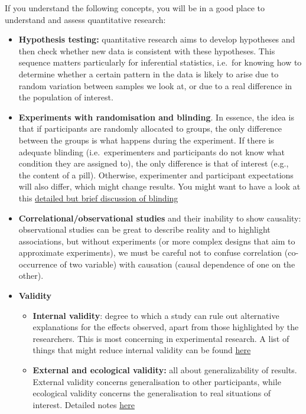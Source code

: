 \documentclass[
]{book}
\providecommand{\tightlist}{%
  \setlength{\itemsep}{0pt}\setlength{\parskip}{0pt}}
\begin{document}
If you understand the following concepts, you will be in a good place to understand and assess quantitative research:

\begin{itemize}
\item
  \textbf{Hypothesis testing:} quantitative research aims to develop hypotheses and then check whether new data is consistent with these hypotheses. This sequence matters particularly for inferential statistics, i.e.~for knowing how to determine whether a certain pattern in the data is likely to arise due to random variation between samples we look at, or due to a real difference in the population of interest.
\item
  \textbf{Experiments with randomisation and blinding}. In essence, the idea is that if participants are randomly allocated to groups, the only difference between the groups is what happens during the experiment. If there is adequate blinding (i.e.~experimenters and participants do not know what condition they are assigned to), the only difference is that of interest (e.g., the content of a pill). Otherwise, experimenter and participant expectations will also differ, which might change results. You might want to have a look at this \href{https://s4be.cochrane.org/blog/2017/06/26/blinding-comprehensive-guide-students/}{detailed but brief discussion of blinding}
\item
  \textbf{Correlational/observational studies} and their inability to show causality: observational studies can be great to describe reality and to highlight associations, but without experiments (or more complex designs that aim to approximate experiments), we must be careful not to confuse correlation (co-occurrence of two variable) with causation (causal dependence of one on the other).
\item
  \textbf{Validity}

  \begin{itemize}
  \tightlist
  \item
    \textbf{Internal validity}: degree to which a study can rule out alternative explanations for the effects observed, apart from those highlighted by the researchers. This is most concerning in experimental research. A list of things that might reduce internal validity can be found \href{https://researchbasics.education.uconn.edu/experimental-_research/}{here}
  \item
    \textbf{External and ecological validity:} all about generalizability of results. External validity concerns generalisation to other participants, while ecological validity concerns the generalisation to real situations of interest. Detailed notes \href{https://researchbasics.education.uconn.edu/external_validity/\#}{here}
  \end{itemize}
\end{itemize}
\end{document}
